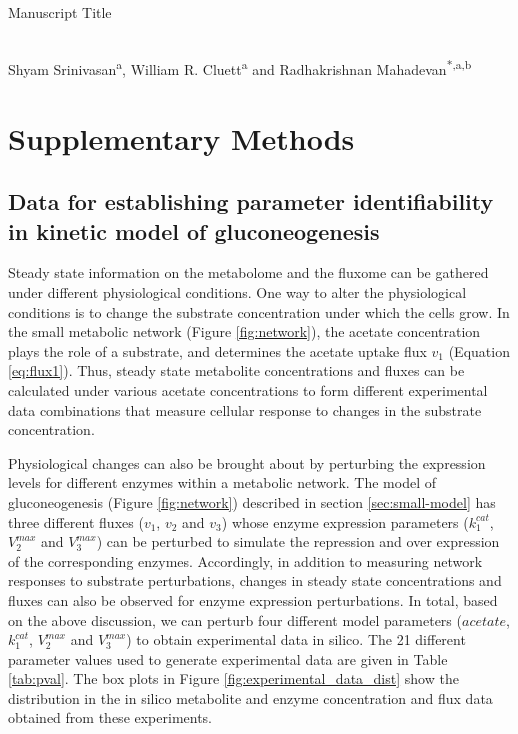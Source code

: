 \documentclass[10pt]{article}
\begin{document}
	\begin{center}
		\begin{Large}
			Manuscript Title 
		\end{Large}\\
		Shyam Srinivasan\textsuperscript{a}, William R. Cluett\textsuperscript{a} and Radhakrishnan Mahadevan\textsuperscript{*,a,b}\\
	\end{center}	

\section{Supplementary Methods}
\subsection{Data for establishing parameter identifiability in kinetic model of gluconeogenesis}\label{sec:experiments}
Steady state information on the metabolome and the fluxome can be gathered under different physiological conditions. One way to alter the physiological conditions is to change the substrate concentration under which the cells grow. In the small metabolic network (Figure \ref{fig:network}), the acetate concentration plays the role of a substrate, and  determines the acetate uptake flux $v_1$ (Equation \ref{eq:flux1}). Thus, steady state metabolite concentrations and fluxes can be calculated under various acetate concentrations to form different experimental data combinations that measure cellular response to changes in the substrate concentration. 

Physiological changes can also be brought about by perturbing the expression levels for different enzymes within a metabolic network. The model of gluconeogenesis (Figure \ref{fig:network}) described in section \ref{sec:small-model} has three different fluxes ($v_1$, $v_2$ and $v_3$) whose enzyme expression parameters ($k_1^{cat}$, $V_2^{max}$ and $V_3^{max}$) can be perturbed to simulate the repression and over expression of the corresponding enzymes. Accordingly, in addition to measuring network responses to substrate perturbations, changes in steady state concentrations and fluxes can also be observed for enzyme expression perturbations. In total, based on the above discussion, we can perturb four different model parameters ($acetate$, $k_1^{cat}$, $V_2^{max}$ and $V_3^{max}$) to obtain experimental data in silico. The 21 different parameter values used to generate experimental data are given in Table \ref{tab:pval}. The box plots in Figure \ref{fig:experimental_data_dist} show the distribution in the in silico metabolite and enzyme concentration and flux data obtained from these experiments.
\end{document}
